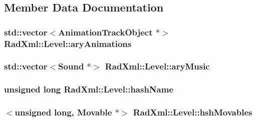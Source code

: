 \subsection{Member Data Documentation}
\hypertarget{class_rad_xml_1_1_level_a823afaa7e23e9119030f46c94fdd8f40}{
\subsubsection[{ary\-Animations}]{\setlength{\rightskip}{0pt plus 5cm}std\-::vector$<${\bf Animation\-Track\-Object} $\ast$$>$ Rad\-Xml\-::\-Level\-::ary\-Animations\hspace{0.3cm}{\ttfamily [protected]}}}\label{class_rad_xml_1_1_level_a823afaa7e23e9119030f46c94fdd8f40}
\hypertarget{class_rad_xml_1_1_level_a5767ff38a0f5ab0577914374a7a1a290}{
\subsubsection[{ary\-Music}]{\setlength{\rightskip}{0pt plus 5cm}std\-::vector$<${\bf Sound} $\ast$$>$ Rad\-Xml\-::\-Level\-::ary\-Music\hspace{0.3cm}{\ttfamily [protected]}}}\label{class_rad_xml_1_1_level_a5767ff38a0f5ab0577914374a7a1a290}
\hypertarget{class_rad_xml_1_1_level_a55340f8e1a6347401bbb6069078d6430}{
\subsubsection[{hash\-Name}]{\setlength{\rightskip}{0pt plus 5cm}unsigned long Rad\-Xml\-::\-Level\-::hash\-Name\hspace{0.3cm}{\ttfamily [protected]}}}\label{class_rad_xml_1_1_level_a55340f8e1a6347401bbb6069078d6430}
\hypertarget{class_rad_xml_1_1_level_a7e8fac30e5a73c9c4e4c73c6f2714b95}{
\subsubsection[{hsh\-Movables}]{$<$unsigned long, {\bf Movable} $\ast$$>$ Rad\-Xml\-::\-Level\-::hsh\-Movables\hspace{0.3cm}{\ttfamily [protected]}}}\label{class_rad_xml_1_1_level_a7e8fac30e5a73c9c4e4c73c6f2714b95}
